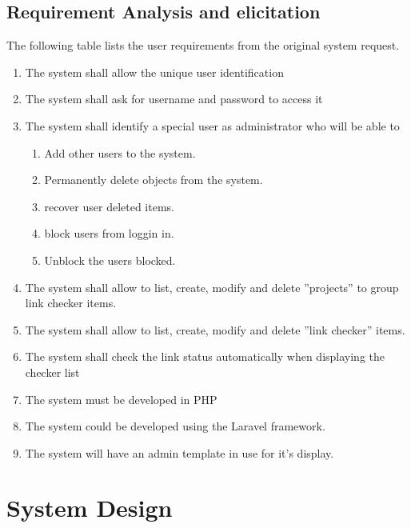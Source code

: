 \subsection{Requirement Analysis and elicitation}
The following table lists the user requirements from the original system request.
\begin{enumerate}
	\item The system shall allow the unique user identification
	\item The system shall ask for username and password to access it
	\item The system shall identify a special user as administrator who will be able to
	\begin{enumerate}
		\item Add other users to the system.
		\item Permanently delete objects from the system.
		\item recover user deleted items.
		\item block users from loggin in.
		\item Unblock the users blocked.
	\end{enumerate}
	\item The system shall allow to list, create, modify and delete ''projects'' to group link checker items.
	\item The system shall allow to list, create, modify and delete ''link checker'' items.
	\item The system shall check the link status automatically when displaying the checker list
	\item The system must be developed in PHP
	\item The system could be developed using the Laravel framework.
	\item The system will have an admin template in use for it's display.
\end{enumerate}

\section{System Design}

